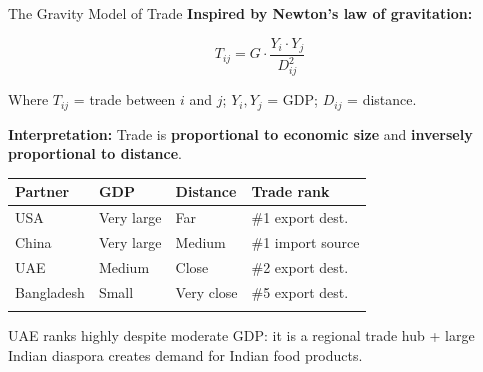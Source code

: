 \documentclass[
  ignorenonframetext,
  aspectratio=169,
]{beamer}
\makeatletter
\let\quarto@originallabel\label
\DeclareRobustCommand*{\label}[1]{\quarto@originallabel{#1}}
\makeatother
\begin{document}
\begin{frame}{The Gravity Model of Trade}
\label{the-gravity-model-of-trade}
\textbf{Inspired by Newton's law of gravitation:}

\[T_{ij} = G \cdot \frac{Y_i \cdot Y_j}{D_{ij}^2}\]

Where \(T_{ij}\) = trade between \(i\) and \(j\); \(Y_i, Y_j\) = GDP;
\(D_{ij}\) = distance.

\textbf{Interpretation:} Trade is \textbf{proportional to economic size}
and \textbf{inversely proportional to distance}.

\begin{longtable}[]{@{}llll@{}}
\toprule\noalign{}
Partner & GDP & Distance & Trade rank \\
\midrule\noalign{}
\endhead
USA & Very large & Far & \#1 export dest. \\
China & Very large & Medium & \#1 import source \\
UAE & Medium & Close & \#2 export dest. \\
Bangladesh & Small & Very close & \#5 export dest. \\
\bottomrule\noalign{}
\end{longtable}

UAE ranks highly despite moderate GDP: it is a regional trade hub +
large Indian diaspora creates demand for Indian food products.
\end{frame}
\end{document}
